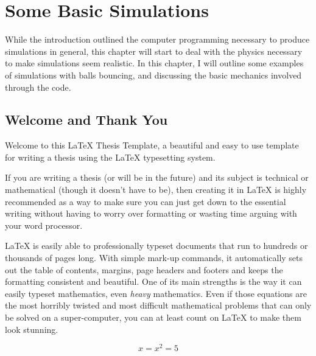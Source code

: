 
\chapter{Some Basic Simulations} %

\label{Chapter1} %




While the introduction outlined the computer programming necessary to produce simulations in general, this chapter will start to deal with the physics necessary to make simulations seem realistic.  In this chapter, I will outline some examples of simulations with balls bouncing, and discussing the basic mechanics involved through the code.



\section{Welcome and Thank You}
Welcome to this \LaTeX{} Thesis Template, a beautiful and easy to use template for writing a thesis using the \LaTeX{} typesetting system.

If you are writing a thesis (or will be in the future) and its subject is technical or mathematical (though it doesn't have to be), then creating it in \LaTeX{} is highly recommended as a way to make sure you can just get down to the essential writing without having to worry over formatting or wasting time arguing with your word processor.

\LaTeX{} is easily able to professionally typeset documents that run to hundreds or thousands of pages long. With simple mark-up commands, it automatically sets out the table of contents, margins, page headers and footers and keeps the formatting consistent and beautiful. One of its main strengths is the way it can easily typeset mathematics, even \emph{heavy} mathematics. Even if those equations are the most horribly twisted and most difficult mathematical problems that can only be solved on a super-computer, you can at least count on \LaTeX{} to make them look stunning.




\begin{equation} \label{eq:blah}
x = x^2 = 5
\end{equation}

